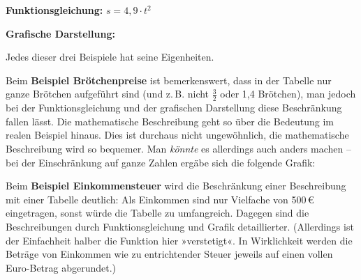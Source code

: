 \textbf{Funktionsgleichung:} $s = 4{,}9 \cdot t^2$

\textbf{Grafische Darstellung:}
\begin{center}
\end{center}
\beispielende

Jedes dieser drei Beispiele hat seine Eigenheiten.

Beim \textbf{Beispiel Brötchenpreise} ist bemerkenswert, dass in der Tabelle nur ganze Brötchen aufgeführt sind (und z.\,B. nicht $\tfrac{3}{2}$ oder 1{,}4 Brötchen), man jedoch bei der Funktionsgleichung und der grafischen Darstellung diese Beschränkung fallen lässt. Die mathematische Beschreibung geht so über die Bedeutung im realen Beispiel hinaus. Dies ist durchaus nicht ungewöhnlich, die mathematische Beschreibung wird so bequemer. Man \emph{könnte} es allerdings auch anders machen -- bei der Einschränkung auf ganze Zahlen ergäbe sich die folgende Grafik:

\begin{center}
\end{center}

Beim \textbf{Beispiel Einkommensteuer} wird die Beschränkung einer Beschreibung mit einer Tabelle deutlich: Als Einkommen sind nur Vielfache von 500\,€ eingetragen, sonst würde die Tabelle zu umfangreich. Dagegen sind die Beschreibungen durch Funktionsgleichung und Grafik detaillierter. (Allerdings ist der Einfachheit halber die Funktion hier »verstetigt«. In Wirklichkeit werden die Beträge von Einkommen wie zu entrichtender Steuer jeweils auf einen vollen Euro-Betrag abgerundet.)


